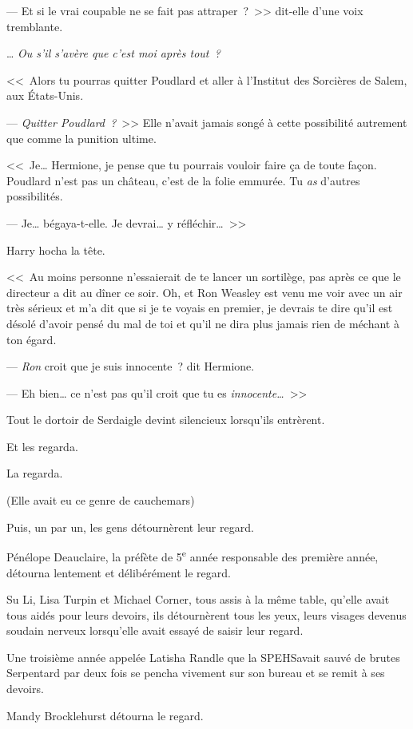 --- Et si le vrai coupable ne se fait pas attraper~?~>> dit-elle d'une voix tremblante.

… \emph{Ou s'il s'avère que c'est moi après tout~?}

<<~Alors tu pourras quitter Poudlard et aller à l'Institut des Sorcières de Salem, aux États-Unis.

--- \emph{Quitter Poudlard~?}~>> Elle n'avait jamais songé à cette possibilité autrement que comme la punition ultime.

<<~Je… Hermione, je pense que tu pourrais vouloir faire ça de toute façon. Poudlard n'est pas un château, c'est de la folie emmurée. Tu \emph{as} d'autres possibilités.

--- Je… bégaya-t-elle. Je devrai… y réfléchir…~>>

Harry hocha la tête.

<<~Au moins personne n'essaierait de te lancer un sortilège, pas après ce que le directeur a dit au dîner ce soir. Oh, et Ron Weasley est venu me voir avec un air très sérieux et m'a dit que si je te voyais en premier, je devrais te dire qu'il est désolé d'avoir pensé du mal de toi et qu'il ne dira plus jamais rien de méchant à ton égard.

--- \emph{Ron} croit que je suis innocente~? dit Hermione.

--- Eh bien… ce n'est pas qu'il croit que tu es \emph{innocente…}~>>

\later

Tout le dortoir de Serdaigle devint silencieux lorsqu'ils entrèrent.

Et les regarda.

La regarda.

(Elle avait eu ce genre de cauchemars)

Puis, un par un, les gens détournèrent leur regard.

Pénélope Deauclaire, la préfète de 5\textsuperscript{e} année responsable des première année, détourna lentement et délibérément le regard.

Su Li, Lisa Turpin et Michael Corner, tous assis à la même table, qu'elle avait tous aidés pour leurs devoirs, ils détournèrent tous les yeux, leurs visages devenus soudain nerveux lorsqu'elle avait essayé de saisir leur regard.

Une troisième année appelée Latisha Randle que la SPEHSavait sauvé de brutes Serpentard par deux fois se pencha vivement sur son bureau et se remit à ses devoirs.

Mandy Brocklehurst détourna le regard.

